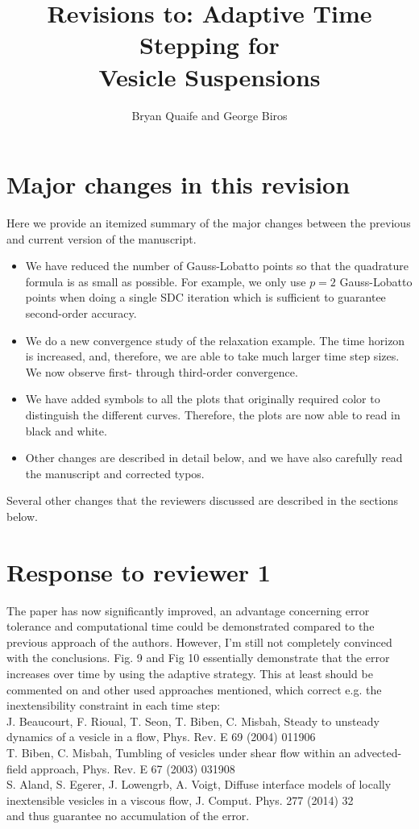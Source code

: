 \documentclass[12pt]{article}
\title{Revisions to: Adaptive Time Stepping for \\ Vesicle Suspensions}
\author{Bryan Quaife and George Biros}
\newcommand{\comment}[1]{{\color{blue} #1}}
\begin{document}
\maketitle


\section*{Major changes in this revision}
Here we provide an itemized summary of the major changes between the
previous and current version of the manuscript.
\begin{itemize}
  \item We have reduced the number of Gauss-Lobatto points so that the
  quadrature formula is as small as possible.  For example, we only use
  $p=2$ Gauss-Lobatto points when doing a single SDC iteration which is
  sufficient to guarantee second-order accuracy.
  \item We do a new convergence study of the relaxation example.  The
  time horizon is increased, and, therefore, we are able to take much
  larger time step sizes.  We now observe first- through third-order
  convergence.
  \item We have added symbols to all the plots that originally required
  color to distinguish the different curves.  Therefore, the plots are
  now able to read in black and white.
  \item Other changes are described in detail below, and we have also
  carefully read the manuscript and corrected typos.
\end{itemize}

Several other changes that the reviewers discussed are described in
the sections below.




\section*{Response to reviewer 1}

\comment{The paper has now significantly improved, an advantage
concerning error tolerance and computational time could be demonstrated
compared to the previous approach of the authors.  However, I'm still
not completely convinced with the conclusions.  Fig. 9 and Fig 10
essentially demonstrate that the error increases over time by using the
adaptive strategy.  This at least should be commented on and other used
approaches mentioned, which correct e.g. the inextensibility constraint
in each time step:\\
J. Beaucourt, F. Rioual, T. Seon, T. Biben, C. Misbah, Steady to
unsteady dynamics of a vesicle in a flow, Phys. Rev. E 69 (2004) 011906
\\
T. Biben, C. Misbah, Tumbling of vesicles under shear flow within an
advected-field approach, Phys. Rev. E 67 (2003) 031908 \\
S. Aland, S. Egerer, J. Lowengrb, A. Voigt, Diffuse interface models of
locally inextensible vesicles in a viscous flow, J. Comput. Phys. 277
(2014) 32\\
and thus guarantee no accumulation of the error.}
\end{document}
